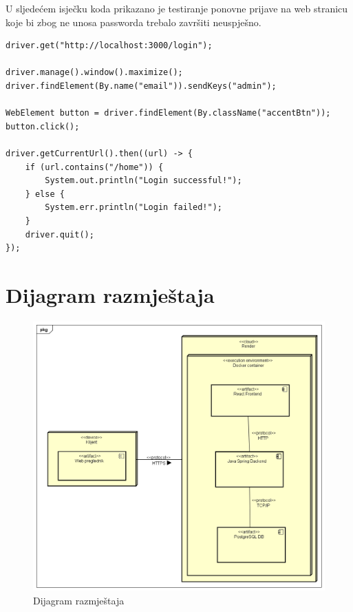 			U sljedećem isječku koda prikazano je testiranje ponovne prijave na web stranicu koje bi zbog ne unosa passworda trebalo završiti neuspješno.

			\begin{lstlisting}
driver.get("http://localhost:3000/login");

driver.manage().window().maximize();
driver.findElement(By.name("email")).sendKeys("admin");

WebElement button = driver.findElement(By.className("accentBtn"));
button.click();

driver.getCurrentUrl().then((url) -> {
	if (url.contains("/home")) {
		System.out.println("Login successful!");
	} else {
		System.err.println("Login failed!");
	}
	driver.quit();        
});
			\end{lstlisting}


		
		
		\section{Dijagram razmještaja}
			
			
			 
			 \begin{figure}[H]
			 	\includegraphics[width=\textwidth]{slike/DeploymentDiagram.PNG}
			 	\caption{Dijagram razmještaja}
			 	\label{fig:deploymentDiagram}
			 \end{figure}
			 
